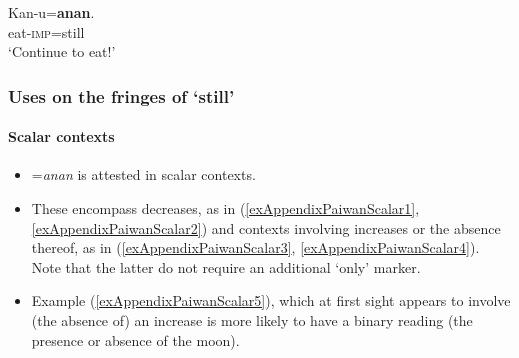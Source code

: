 \begin{exe}
	 \ex\label{exAppendixPaiwan5}
	\gll Kan-u=\textbf{anan}.\\
	eat-\textsc{imp}=still\\
	\glt \lq Continue to eat!\rq{ }\parencite[229]{Chang2006}
\end{exe}

\subsubsection{Uses on the fringes of \lq{}still\rq{}}
\paragraph{Scalar contexts}\label{appendixPaiwanScalar}
\begin{itemize}
	\item =\textit{anan} is attested in scalar contexts.
	\item These encompass decreases, as in (\ref{exAppendixPaiwanScalar1}, \ref{exAppendixPaiwanScalar2}) and contexts involving increases or the absence thereof, as in (\ref{exAppendixPaiwanScalar3}, \ref{exAppendixPaiwanScalar4}). Note that the latter do not require an additional \lq only\rq{ }marker.	
	 \item Example (\ref{exAppendixPaiwanScalar5}), which at first sight appears to involve (the absence of) an increase is more likely to have a binary reading (the presence or absence of the moon).
\end{itemize}

